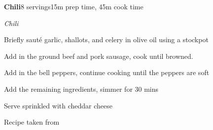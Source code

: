 \documentclass[../recipe-collections/cooking.tex]{subfiles}
\begin{document}
\begin{recipe}{\textbf{Chili}}{8 servings}{15m prep time, 45m cook time}

  \freeform{}\textit{Chili}


  Briefly saut\'e garlic, shallots, and celery in olive oil using a stockpot


  Add in the ground beef and pork sausage, cook until browned.


  Add in the bell peppers, continue cooking until the peppers are soft


  Add the remaining ingredients, simmer for 30 mins


  Serve sprinkled with cheddar cheese

  \freeform{}\hrulefill{}

\end{recipe}
Recipe taken from  \autocite{bernstein_2005}
\end{document}
